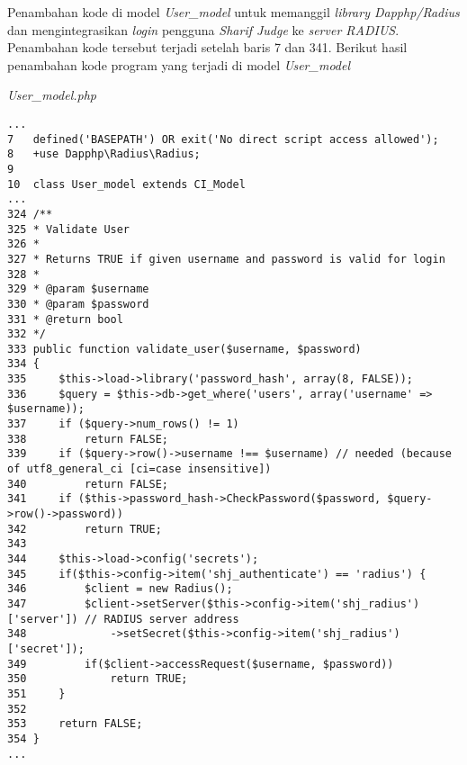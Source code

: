 Penambahan kode di model \textit{User\_model} untuk memanggil \textit{library Dapphp/Radius} dan mengintegrasikan \textit{login} pengguna \textit{Sharif Judge} ke \textit{server RADIUS}. Penambahan kode tersebut terjadi setelah baris 7 dan 341. Berikut hasil penambahan kode program yang terjadi di model \textit{User\_model}

\textit{User\_model.php}
\begin{lstlisting}[basicstyle=\ttfamily, frame=single,
columns=fullflexible, keepspaces=true, breaklines=true]
...
7	defined('BASEPATH') OR exit('No direct script access allowed');
8	+use Dapphp\Radius\Radius;
9
10	class User_model extends CI_Model
...
324	/**
325	* Validate User
326	*
327	* Returns TRUE if given username and password is valid for login
328	*
329	* @param $username
330	* @param $password
331	* @return bool
332	*/
333	public function validate_user($username, $password)
334	{
335		$this->load->library('password_hash', array(8, FALSE));
336		$query = $this->db->get_where('users', array('username' => $username));
337		if ($query->num_rows() != 1)
338			return FALSE;
339		if ($query->row()->username !== $username) // needed (because of utf8_general_ci [ci=case insensitive])
340			return FALSE;
341		if ($this->password_hash->CheckPassword($password, $query->row()->password))
342			return TRUE;
343
344		$this->load->config('secrets');
345		if($this->config->item('shj_authenticate') == 'radius') {
346			$client = new Radius();
347			$client->setServer($this->config->item('shj_radius')['server']) // RADIUS server address
348				->setSecret($this->config->item('shj_radius')['secret']);
349			if($client->accessRequest($username, $password))
350				return TRUE;
351		}
352		
353		return FALSE;
354	}
...
\end{lstlisting}